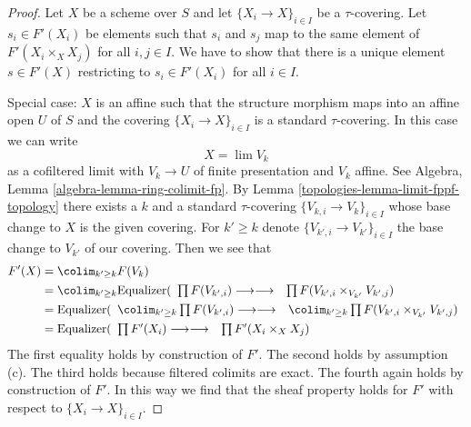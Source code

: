 \begin{proof}

Let $X$ be a scheme over $S$ and let $\{X_i \to X\}_{i \in I}$
be a $\tau$-covering. Let $s_i \in F'(X_i)$ be elements such that
$s_i$ and $s_j$ map to the same element of $F'(X_i \times_X X_j)$
for all $i, j \in I$. We have to show that there is a
unique element $s \in F'(X)$ restricting to $s_i \in F'(X_i)$ for all $i \in I$.

\medskip\noindent
Special case: $X$ is an affine such that the structure morphism
maps into an affine open $U$ of $S$ and the covering
$\{X_i \to X\}_{i \in I}$ is a standard $\tau$-covering.
In this case we can write
$$
X = \lim V_k
$$
as a cofiltered limit with $V_k \to U$ of finite presentation
and $V_k$ affine. See Algebra, Lemma \ref{algebra-lemma-ring-colimit-fp}.
By Lemma \ref{topologies-lemma-limit-fppf-topology} there exists a $k$ and a standard
$\tau$-covering $\{V_{k, i} \to V_k\}_{i \in I}$ whose base change
to $X$ is the given covering. For $k' \geq k$ denote
$\{V_{k', i} \to V_{k'}\}_{i \in I}$ the base change to $V_{k'}$
of our covering. Then we see that
\begin{align*}
F'(X)
& =
\colim_{k' \geq k} F(V_k) \\
& =
\colim_{k' \geq k}
\text{Equalizer}(
\begin{array}{cc}\prod F(V_{k', i})
\longrightarrow\longrightarrow & \prod F(V_{k', i} \times_{V_{k'}} V_{k', j})\end{array}
\\
& =
\text{Equalizer}(
\begin{array}{cc}\colim_{k' \geq k}
\prod F(V_{k', i})
\longrightarrow\longrightarrow & \colim_{k' \geq k}
\prod F(V_{k', i} \times_{V_{k'}} V_{k', j})\end{array}
\\
& =
\text{Equalizer}(
\begin{array}{cc}\prod F'(X_i)
\longrightarrow\longrightarrow & \prod F'(X_i \times_X X_j)\end{array}
\end{align*}
The first equality holds by construction of $F'$. The second holds by
assumption (c). The third holds because filtered colimits are exact.
The fourth again holds by construction of $F'$.
In this way we find that the sheaf property holds for $F'$
with respect to $\{X_i \to X\}_{i \in I}$.


\end{proof}
